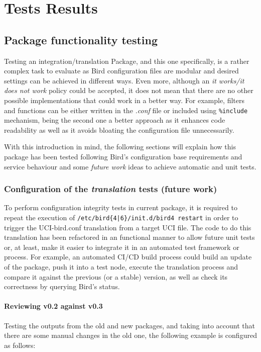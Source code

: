 \chapter{Tests Results}
\label{ch:tresults}

\section{Package functionality testing}
Testing an integration/translation Package, and this one specifically, is a rather complex task to evaluate as Bird configuration files are modular and desired settings can be achieved in different ways.
Even more, although an \textit{it works/it does not work} policy could be accepted, it does not mean that there are no other possible implementations that could work in a better way.
For example, filters and functions can be either written in the \textit{.conf} file or included using \texttt{\%include} mechanism, being the second one a better approach as it enhances code readability as well as it avoids bloating the configuration file unnecessarily.

With this introduction in mind, the following sections will explain how this package has been tested following Bird's configuration base requirements and service behaviour and some \textit{future work} ideas to achieve automatic and unit tests.


\subsection{Configuration of the \textit{translation} tests (future work)}
To perform configuration integrity tests in current package, it is required to repeat the execution of \texttt{/etc/bird\{4|6\}/init.d/bird4 restart} in order to trigger the UCI-bird.conf translation from a target UCI file. The code to do this translation has been refactored in an functional manner to allow future unit tests or, at least, make it easier to integrate it in an automated test framework or process. For example, an automated CI/CD build process could build an update of the package, push it into a test node, execute the translation process and compare it against the previous (or a stable) version, as well as check its correctness by querying Bird's status.

\subsubsection{Reviewing v0.2 against v0.3}
Testing the outputs from the old and new packages, and taking into account that there are some manual changes in the old one, the following example is configured as follows:

